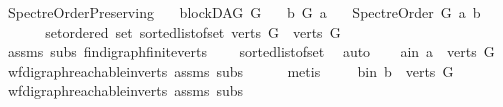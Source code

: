\begin{isabellebody}
\isanewline
\isanewline
{}\isamarkupfalse%
\ Spectre{\isacharunderscore}{\kern0pt}Order{\isacharunderscore}{\kern0pt}Preserving{\isacharcolon}{\kern0pt}\isanewline
\ \ \ {\isachardoublequoteopen}blockDAG\ G{\isachardoublequoteclose}\isanewline
\ \ \ {\isachardoublequoteopen}b\ {\isasymrightarrow}\isactrlsup {\isacharplus}{\kern0pt}\isactrlbsub G\isactrlesub \ a{\isachardoublequoteclose}\isanewline
\ \ \ {\isachardoublequoteopen}Spectre{\isacharunderscore}{\kern0pt}Order\ G\ a\ b{\isachardoublequoteclose}\ \isanewline
%
\isadelimproof
%
\endisadelimproof
%
\isatagproof
{}\isamarkupfalse%
\ {\isacharminus}{\kern0pt}\ \isanewline
\ \ \isamarkupfalse%
\ set{\isacharunderscore}{\kern0pt}ordered{\isacharcolon}{\kern0pt}\ {\isachardoublequoteopen}set\ {\isacharparenleft}{\kern0pt}sorted{\isacharunderscore}{\kern0pt}list{\isacharunderscore}{\kern0pt}of{\isacharunderscore}{\kern0pt}set\ {\isacharparenleft}{\kern0pt}verts\ G{\isacharparenright}{\kern0pt}{\isacharparenright}{\kern0pt}\ {\isacharequal}{\kern0pt}\ verts\ G{\isachardoublequoteclose}\isanewline
\ \ \ \ \isamarkupfalse%
\ assms{\isacharparenleft}{\kern0pt}{}{\isacharparenright}{\kern0pt}\ subs\ fin{\isacharunderscore}{\kern0pt}digraph{\isachardot}{\kern0pt}finite{\isacharunderscore}{\kern0pt}verts\isanewline
\ \ \ \ sorted{\isacharunderscore}{\kern0pt}list{\isacharunderscore}{\kern0pt}of{\isacharunderscore}{\kern0pt}set\ \isamarkupfalse%
\ auto\isanewline
\ \ \isamarkupfalse%
\ a{\isacharunderscore}{\kern0pt}in{\isacharcolon}{\kern0pt}\ {\isachardoublequoteopen}a\ {\isasymin}\ verts\ G{\isachardoublequoteclose}\ \isamarkupfalse%
\ wf{\isacharunderscore}{\kern0pt}digraph{\isachardot}{\kern0pt}reachable{}{\isacharunderscore}{\kern0pt}in{\isacharunderscore}{\kern0pt}verts{\isacharparenleft}{\kern0pt}{}{\isacharparenright}{\kern0pt}\ assms\ subs\isanewline
\ \ \ \ \isamarkupfalse%
\ metis\ \isanewline
\ \ \isamarkupfalse%
\ b{\isacharunderscore}{\kern0pt}in{\isacharcolon}{\kern0pt}\ {\isachardoublequoteopen}b\ {\isasymin}\ verts\ G{\isachardoublequoteclose}\ \isamarkupfalse%
\ wf{\isacharunderscore}{\kern0pt}digraph{\isachardot}{\kern0pt}reachable{}{\isacharunderscore}{\kern0pt}in{\isacharunderscore}{\kern0pt}verts{\isacharparenleft}{\kern0pt}{}{\isacharparenright}{\kern0pt}\ assms\ subs\isanewline
\ \ \ \ \isamarkupfalse%

\end{isabellebody}
